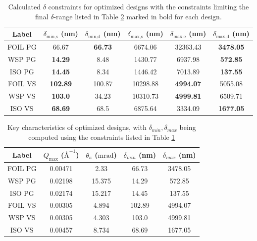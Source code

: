 \documentclass{article}
\begin{document}
\begin{table}[h!]
	\centering
	\begin{tabular}{c|cc|ccc}
		\toprule
		Label & $\delta_{\text{min,s}}$ (nm) & $\delta_{\text{min,d}}$ (nm) & $\delta_{\text{max,s}}$ (nm) & $\delta_{\text{max,e}}$ (nm) & $\delta_{\text{max,d}}$ (nm) \\
		\midrule
		FOIL PG & 66.67 & \textbf{66.73} & 6674.06 & 32363.43 & \textbf{3478.05} \\
		WSP PG & \textbf{14.29} & 8.48 & 1430.77 & 6937.98 & \textbf{572.85} \\
		ISO PG & \textbf{14.45} & 8.34 & 1446.42 & 7013.89 & \textbf{137.55} \\
		FOIL VS & \textbf{102.89} & 100.87 & 10298.88 & \textbf{4994.07} & 5055.08 \\
		WSP VS & \textbf{103.0} & 34.23 & 10310.73 & \textbf{4999.81} & 6509.71 \\
		ISO VS & \textbf{68.69} & 68.5 & 6875.64 & 3334.09 & \textbf{1677.05} \\
		\bottomrule
	\end{tabular}
	\caption{Calculated $\delta$ constraints for optimized designs with the constraints limiting the final $\delta$-range listed in Table \ref{tab:optimized-designs-performance} marked in bold for each design.}
	\label{tab:optimized-designs-delta-constraints}
\end{table}

\begin{table}[h!]
	\centering
	\begin{tabular}{c | c c c c}
		\toprule
		Label & $Q_{\text{max}}$ ($\text{\AA}^{-1}$) & $\theta_a$ ($\unit{\milli\radian}$) & $\delta_{min}$ (nm) & $\delta_{max}$ (nm) \\
		\midrule
		FOIL PG & 0.00471 & 2.33 & 66.73 & 3478.05 \\
		WSP PG & 0.02198 & 15.375 & 14.29 & 572.85 \\
		ISO PG & 0.02174 & 15.217 & 14.45 & 137.55 \\
		FOIL VS & 0.00305 & 4.894 & 102.89 & 4994.07 \\
		WSP VS & 0.00305 & 4.303 & 103.0 & 4999.81 \\
		ISO VS & 0.00457 & 8.734 & 68.69 & 1677.05 \\
		\bottomrule
	\end{tabular}
	\caption{Key characteristics of optimized designs, with $\delta_{min}, \delta_{max}$ being computed using the constraints listed in Table \ref{tab:optimized-designs-delta-constraints}}
	\label{tab:optimized-designs-performance}
\end{table}
\end{document}
